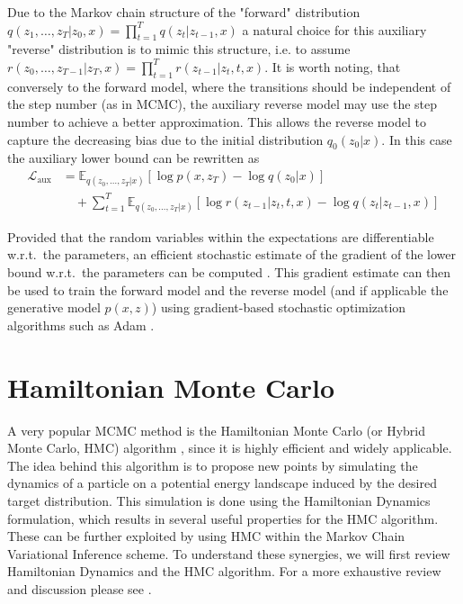 \documentclass[12pt]{scrartcl}
\newcommand{\E}{\mathbb{E}}
\begin{document}
Due to the Markov chain structure of the "forward" distribution $q(z_1, \dots, z_T|z_0, x) = \prod_{t=1}^T q(z_t|z_{t-1}, x)$ a natural choice for this auxiliary "reverse" distribution is to mimic this structure, i.e. to assume $r(z_0, \dots, z_{T-1} |z_T, x) = \prod_{t=1}^T r(z_{t-1}|z_t, t, x)$. It is worth noting, that conversely to the forward model, where the transitions should be independent of the step number (as in MCMC), the auxiliary reverse model may use the step number to achieve a better approximation. This allows the reverse model to capture the decreasing bias due to the initial distribution $q_0(z_0|x)$. In this case the auxiliary lower bound can be rewritten as
\begin{equation} \label{eq:MCVIAuxLowerBound}
\begin{split}
\mathcal{L}_{\textrm{aux}} &= \E_{q(z_0, \dots, z_T|x)} \left[ \log p(x, z_T) - \log q(z_0|x) \right] \\
& \quad + \sum_{t=1}^T \E_{q(z_0, \dots, z_T|x)} \left[ \log r(z_{t-1}|z_t, t, x) - \log q(z_t|z_{t-1}, x)  \right] 
\end{split}
\end{equation}

Provided that the random variables within the expectations are differentiable w.r.t.\ the parameters, an efficient stochastic estimate of the gradient of the lower bound w.r.t.\ the parameters can be computed \citep{Kingma2014, Rezende2014}. This gradient estimate can then be used to train the forward model and the reverse model (and if applicable the generative model $p(x, z)$) using gradient-based stochastic optimization algorithms such as Adam \citep{Kingma2015}.

\section{Hamiltonian Monte Carlo}

A very popular MCMC method is the Hamiltonian Monte Carlo (or Hybrid Monte Carlo, HMC) algorithm \citep{Duane1987}, since it is highly efficient and widely applicable. The idea behind this algorithm is to propose new points by simulating the dynamics of a particle on a potential energy landscape induced by the desired target distribution. This simulation is done using the Hamiltonian Dynamics formulation, which results in several useful properties for the HMC algorithm. These can be further exploited by using HMC within the Markov Chain Variational Inference scheme. To understand these synergies, we will first review Hamiltonian Dynamics and the HMC algorithm. For a more exhaustive review and discussion please see \citep{Neal2011}.
\end{document}
